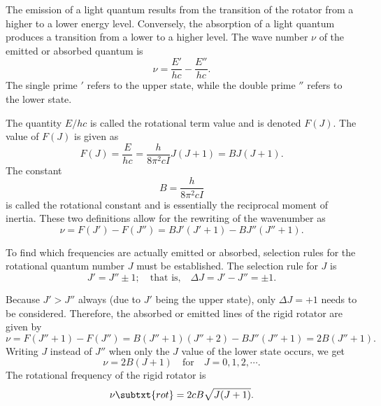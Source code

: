The emission of a light quantum results from the transition of the rotator from a higher to a lower energy level. Conversely, the absorption of a light quantum produces a transition from a lower to a higher level. The wave number $\nu$ of the emitted or absorbed quantum is
\begin{equation*}
    \nu = \frac{E'}{hc} - \frac{E''}{hc}.
\end{equation*}
The single prime $'$ refers to the upper state, while the double prime $''$ refers to the lower state.

The quantity $E/hc$ is called the rotational term value and is denoted $F(J)$. The value of $F(J)$ is given as
\begin{equation*}
    F(J) = \frac{E}{hc} = \frac{h}{8\pi^{2}cI}J(J + 1) = BJ(J + 1).
\end{equation*}
The constant
\begin{equation*}
    B = \frac{h}{8\pi^{2}cI}
\end{equation*}
is called the rotational constant and is essentially the reciprocal moment of inertia. These two definitions allow for the rewriting of the wavenumber as
\begin{equation*}
    \nu = F(J')- F(J'') = BJ'(J' + 1) - BJ''(J'' + 1).
\end{equation*}

To find which frequencies are actually emitted or absorbed, selection rules for the rotational quantum number $J$ must be established. The selection rule for $J$ is
\begin{equation*}
    J' = J'' \pm 1; \quad\text{that is,}\quad \Delta{}J = J' - J'' = \pm 1.
\end{equation*}

Because $J' > J''$ always (due to $J'$ being the upper state), only $\Delta{}J = +1$ needs to be considered. Therefore, the absorbed or emitted lines of the rigid rotator are given by
\begin{equation*}
    \nu = F(J'' + 1) - F(J'') = B(J'' + 1)(J'' + 2) - BJ''(J'' + 1) = 2B(J'' + 1).
\end{equation*}
Writing $J$ instead of $J''$ when only the $J$ value of the lower state occurs, we get
\begin{equation*}
    \nu = 2B(J + 1) \quad\text{for}\quad J = 0, 1, 2, \dotsb.
\end{equation*}
The rotational frequency of the rigid rotator is
\begin{equation*}
    \nu\subtxt{rot} = 2cB\sqrt{J(J + 1)}.
\end{equation*}

